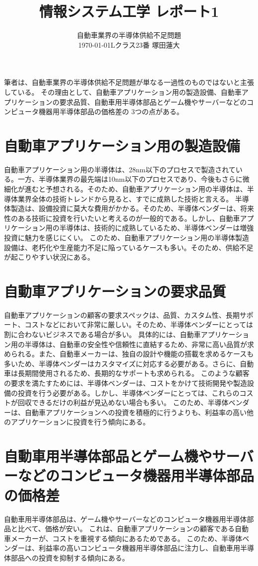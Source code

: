 \documentclass[a4j, twocolumn, uplatex]{jsarticle}
\title{\vspace{-5cm}情報システム工学 レポート1}
\author{自動車業界の半導体供給不足問題 \\ \today Lクラス23番 塚田蓮大}
\date{}
\numberwithin{equation}{section}
\begin{document}
	\maketitle
	筆者は、自動車業界の半導体供給不足問題が単なる一過性のものではないと主張している。
	その理由として、自動車アプリケーション用の製造設備、自動車アプリケーションの要求品質、自動車用半導体部品とゲーム機やサーバーなどのコンピュータ機器用半導体部品の価格差の
	3つの点がある。
	\section{自動車アプリケーション用の製造設備}
		自動車アプリケーション用の半導体は、28nm以下のプロセスで製造されている。一方、半導体業界の最先端は10nm以下のプロセスであり、今後もさらに微細化が進むと予想される。そのため、自動車アプリケーション用の半導体は、半導体業界全体の技術トレンドから見ると、すでに成熟した技術と言える。
		半導体製造は、設備投資に莫大な費用がかかる。そのため、半導体ベンダーは、将来性のある技術に投資を行いたいと考えるのが一般的である。しかし、自動車アプリケーション用の半導体は、技術的に成熟しているため、半導体ベンダーは増強投資に魅力を感じにくい。
		このため、自動車アプリケーション用の半導体製造設備は、老朽化や生産能力不足に陥っているケースも多い。そのため、供給不足が起こりやすい状況にある。

	\section{自動車アプリケーションの要求品質}
		自動車アプリケーションの顧客の要求スペックは、品質、カスタム性、長期サポート、コストなどにおいて非常に厳しい。そのため、半導体ベンダーにとっては割に合わないビジネスである場合が多い。
		具体的には、自動車アプリケーション用の半導体は、自動車の安全性や信頼性に直結するため、非常に高い品質が求められる。また、自動車メーカーは、独自の設計や機能の搭載を求めるケースも多いため、半導体ベンダーはカスタマイズに対応する必要がある。さらに、自動車は長期間使用されるため、長期的なサポートも求められる。
		このような顧客の要求を満たすためには、半導体ベンダーは、コストをかけて技術開発や製造設備の投資を行う必要がある。しかし、半導体ベンダーにとっては、これらのコストが回収できるだけの利益が見込めない場合も多い。
		このため、半導体ベンダーは、自動車アプリケーションへの投資を積極的に行うよりも、利益率の高い他のアプリケーションに投資を行う傾向にある。

	\section{自動車用半導体部品とゲーム機やサーバーなどのコンピュータ機器用半導体部品の価格差}
		自動車用半導体部品は、ゲーム機やサーバーなどのコンピュータ機器用半導体部品と比べて、価格が安い。
		これは、自動車アプリケーションの顧客である自動車メーカーが、コストを重視する傾向にあるためである。
		このため、半導体ベンダーは、利益率の高いコンピュータ機器用半導体部品に注力し、自動車用半導体部品への投資を抑制する傾向にある。
\end{document}
